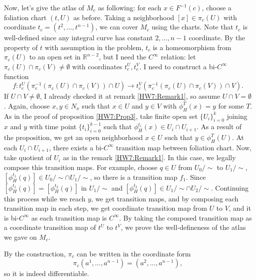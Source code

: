 \documentclass[a4paper, 12pt]{article}
\theoremstyle{Mydefinition}
\theoremstyle{Mytheorem}
\begin{document}
\begin{enumerate}
    Now, let's give the atlas of $M_c$ as following: for each $x\in F^{-1}(c)$, choose a foliation chart $(t, U)$ as before. Taking a neighborhood $[x]\in\pi_c(U)$ with coordinate $t_c = (t^2, \ldots, t^{n-1})$, we can cover $M_c$ using the charts. Note that $t_c$ is well-defined since any integral curve has constant $2, \ldots, n-1$ coordinate. By the property of $t$ with assumption in the problem, $t_c$ is a homeomorphism from $\pi_c(U)$ to an open set in $\mathbb{R}^{n-2}$, but I need the $C^\infty$ relation: let $\pi_c(U)\cap \pi_c(V)\neq \emptyset$ with coordinates $t^U_c, t^V_c$. I need to construct a bi-$C^\infty$ function
    \begin{equation*}
        f:t^U_c\left(\pi_c^{-1}(\pi_c(U)\cap \pi_c(V))\cap U\right) \rightarrow t^V_c\left(\pi_c^{-1}(\pi_c(U)\cap \pi_c(V))\cap V\right).
    \end{equation*}
    If $U\cap V\neq \emptyset$, I already checked it at remark \ref{HW7:Remark1}, so assume $U\cap V= \emptyset$. Again, choose $x,y\in N_x$ such that $x\in U$ and $y\in V$ with $\phi^T_H(x) = y$ for some $T$. As in the proof of proposition \ref{HW7:Prop3}, take finite open set $\{U_i\}_{i=0}^k$ joining $x$ and $y$ with time point $\{t_i\}_{i=0}^{k-1}$ such that $\phi^{t_i}_H(x)\in U_i\cap U_{i+1}$. As a result of the proposition, we get an open neighborhood $x\in U$ such that $y\in \phi^T_H(U)$. At each $U_i\cap U_{i+1}$, there exists a bi-$C^\infty$ transition map between foliation chart. Now, take quotient of $U_i$ as in the remark \ref{HW7:Remark1}. In this case, we legally compose this transition maps. For example, choose $q\in U$ from $U_0/\sim$ to $U_1/\sim$, $[\phi^{t_1}_H(q)]\in U_0/\sim \cap U_1/\sim$, so there is a transition map $f_1$. Since $[\phi^{t_1}_H(q)] = [\phi^{t_2}_H(q)]$ in $U_1/\sim$ and $[\phi^{t_2}_H(q)]\in U_1/\sim \cap U_2/\sim$. Continuing this process while we reach $y$, we get transition maps, and by composing each transition map in each step, we get coordinate transition map from $U$ to $V$, and it is bi-$C^\infty$ as each transition map is $C^\infty$. By taking the composed transition map as a coordinate transition map of $t^U$ to $t^V$, we prove the well-defineness of the atlas we gave on $M_c$.
    
    By the construction, $\pi_c$ can be written in the coordinate form
    \begin{equation*}
        \pi_c(a^1, \ldots, a^{n-1}) = (a^2, \ldots, a^{n-1}),
    \end{equation*}
    so it is indeed differentiable.
    

\end{enumerate}
\end{document}
